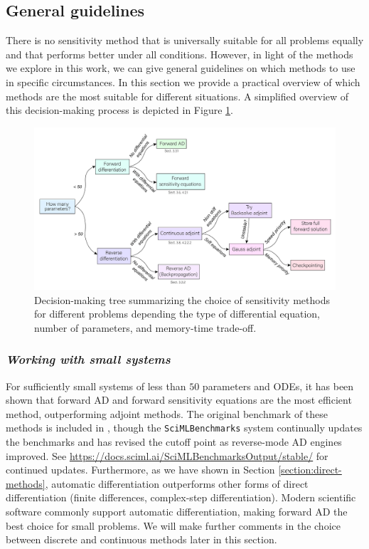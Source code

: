 \subsection{General guidelines}

There is no sensitivity method that is universally suitable for all problems equally and that performs better under all conditions. 
However, in light of the methods we explore in this work, we can give general guidelines on which methods to use in specific circumstances. In this section we provide a practical overview of which methods are the most suitable for different situations. 
A simplified overview of this decision-making process is depicted in Figure \ref{fig:roadmap}. 

\begin{figure}[tb]
    \centering
    \includegraphics[width=1\textwidth]{tex/figures/roadmap.pdf}
    \caption{Decision-making tree summarizing the choice of sensitivity methods for different problems depending the type of differential equation, number of parameters, and memory-time trade-off.}
    \label{fig:roadmap}
\end{figure}

\subsubsection*{\textit{Working with small systems}}

For sufficiently small systems of less than $50$ parameters and ODEs, it has been shown that forward AD and forward sensitivity equations are the most efficient method, outperforming adjoint methods. 
The original benchmark of these methods is included in \cite{ma2021comparison}, though the \texttt{SciMLBenchmarks} system continually updates the benchmarks and has revised the cutoff point as reverse-mode AD engines improved. 
See \url{https://docs.sciml.ai/SciMLBenchmarksOutput/stable/} for continued updates.
Furthermore, as we have shown in Section \ref{section:direct-methods}, automatic differentiation outperforms other forms of direct differentiation (finite differences, complex-step differentiation). 
Modern scientific software commonly support automatic differentiation, making forward AD the best choice for small problems. 
We will make further comments in the choice between discrete and continuous methods later in this section.


